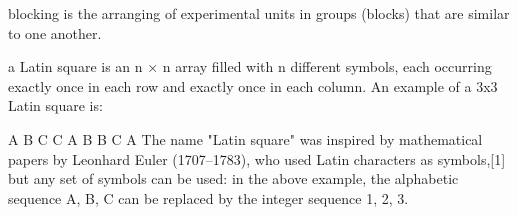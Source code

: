 blocking is the arranging of experimental units in groups (blocks) that are similar to one another.

a Latin square is an n × n array filled with n different symbols, each occurring exactly once in each row and exactly once in each column. An example of a 3x3 Latin square is:

A	B	C
C	A	B
B	C	A
The name "Latin square" was inspired by mathematical papers by Leonhard Euler (1707–1783), who used Latin characters as symbols,[1] but any set of symbols can be used: in the above example, the alphabetic sequence A, B, C can be replaced by the integer sequence 1, 2, 3.
